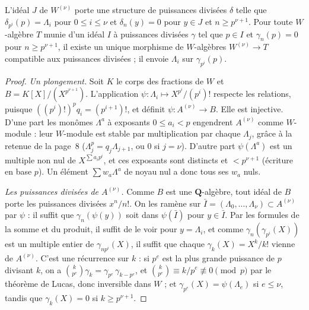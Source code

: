 \begin{encadre}
\begin{theoreme}
L'idéal $J$ de $W^{(\nu)}$ porte une structure de puissances divisées $\delta$ telle que $\delta_{p^i}(p) = \Lambda_i$ pour $0 \leq i \leq \nu$ et $\delta_n(y) = 0$ pour $y \in J$ et $n \geq p^{\nu+1}$. Pour toute $W$-algèbre $T$ munie d'un idéal $I$ à puissances divisées $\gamma$ tel que $p \in I$ et $\gamma_n(p) = 0$ pour $n \geq p^{\nu+1}$, il existe un unique morphisme de $W$-algèbres $W^{(\nu)} \to T$ compatible aux puissances divisées ; il envoie $\Lambda_i$ sur $\gamma_{p^i}(p)$.
\end{theoreme}
\end{encadre}

\begin{proof}
\emph{Un plongement.} Soit $K$ le corps des fractions de $W$ et $B = K[X]/(X^{p^{\nu+1}})$. L'application $\psi : \Lambda_i \mapsto X^{p^i}/(p^i)!$ respecte les relations, puisque $((p^i)!)^p q_i = (p^{i+1})!$, et définit $\psi : A^{(\nu)} \to B$. Elle est injective. D'une part les monômes $\Lambda^a$ à exposants $0 \leq a_i < p$ engendrent $A^{(\nu)}$ comme $W$-module : leur $W$-module est stable par multiplication par chaque $\Lambda_j$, grâce à la retenue de la page~8 ($\Lambda_j^{p} = q_j\Lambda_{j+1}$, ou $0$ si $j = \nu$). D'autre part $\psi(\Lambda^a)$ est un multiple non nul de $X^{\sum a_i p^i}$, et ces exposants sont distincts et $< p^{\nu+1}$ (écriture en base $p$). Un élément $\sum w_a \Lambda^a$ de noyau nul a donc tous ses $w_a$ nuls.

\emph{Les puissances divisées de $A^{(\nu)}$.} Comme $B$ est une $\mathbf Q$-algèbre, tout idéal de $B$ porte les puissances divisées $x^n/n!$. On les ramène sur $\bar I = (\Lambda_0, \ldots, \Lambda_\nu) \subset A^{(\nu)}$ par $\psi$ : il suffit que $\gamma_n(\psi(y))$ soit dans $\psi(\bar I)$ pour $y \in \bar I$. Par les formules de la somme et du produit, il suffit de le voir pour $y = \Lambda_i$, et comme $\gamma_n(\gamma_{p^i}(X))$ est un multiple entier de $\gamma_{np^i}(X)$, il suffit que chaque $\gamma_k(X) = X^k/k!$ vienne de $A^{(\nu)}$. C'est une récurrence sur $k$ : si $p^e$ est la plus grande puissance de $p$ divisant $k$, on a $\binom{k}{p^e}\gamma_k = \gamma_{p^e}\,\gamma_{k-p^e}$, et $\binom{k}{p^e} \equiv k/p^e \not\equiv 0 \pmod p$ par le théorème de Lucas, donc inversible dans $W$ ; et $\gamma_{p^e}(X) = \psi(\Lambda_e)$ si $e \leq \nu$, tandis que $\gamma_k(X) = 0$ si $k \geq p^{\nu+1}$.


\end{proof}
